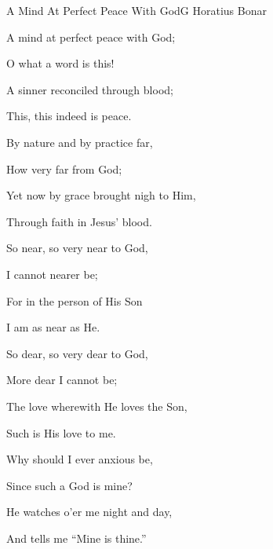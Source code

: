 \documentclass[12pt]{book}
\begin{document}






\begin{song}{A Mind At Perfect Peace With God}{G}
  {\SBPubDom}
  {Horatius Bonar}
  {}
  {}

  \begin{SBVerse}
    A mind at perfect peace with God;

    O what a word is this!

    A sinner reconciled through blood;

    This, this indeed is peace.
  \end{SBVerse}

  \begin{SBVerse}
    By nature and by practice far,

    How very far from God;

    Yet now by grace brought nigh to Him,

    Through faith in Jesus' blood.
  \end{SBVerse}

  \begin{SBVerse}
    So near, so very near to God,

    I cannot nearer be;

    For in the person of His Son

    I am as near as He.
  \end{SBVerse}

  \begin{SBVerse}
    So dear, so very dear to God,

    More dear I cannot be;

    The love wherewith He loves the Son,

    Such is His love to me.
  \end{SBVerse}

  \begin{SBVerse}
    Why should I ever anxious be,

    Since such a God is mine?

    He watches o'er me night and day,

    And tells me ``Mine is thine.''
  \end{SBVerse}
\end{song}
\end{document}
